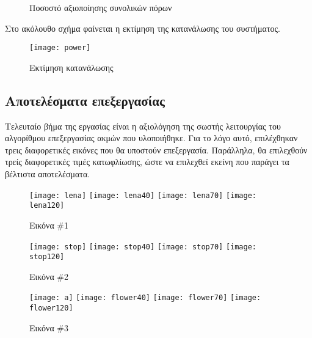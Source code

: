 \begin{figure}[H]
	\begin{center}
	\end{center}
	\caption{Ποσοστό αξιοποίησης συνολικών πόρων}
\end{figure}
\noindent Στο ακόλουθο σχήμα φαίνεται η εκτίμηση της κατανάλωσης του συστήματος.

\begin{figure}[H]
   \centering
   \texttt{[image: power]}\\
   \caption{Εκτίμηση κατανάλωσης}
\end{figure}

\subsection{Αποτελέσματα επεξεργασίας}

Τελευταίο βήμα της εργασίας είναι η αξιολόγηση της σωστής λειτουργίας του αλγορίθμου επεξεργασίας ακμών που υλοποιήθηκε. Για το λόγο αυτό, επιλέχθηκαν τρεις διαφορετικές εικόνες που θα υποστούν επεξεργασία. Παράλληλα, θα επιλεχθούν τρείς διαφορετικές τιμές κατωφλίωσης, ώστε να επιλεχθεί εκείνη που παράγει τα βέλτιστα αποτελέσματα.
\begin{figure}[H]
\centering
{}%
  {\texttt{[image: lena]}}
  {\texttt{[image: lena40]}}
	{\texttt{[image: lena70]}}
	{\texttt{[image: lena120]}}
\caption{Εικόνα \#1}
\end{figure}
\begin{figure}[H]
\centering
{}%
  {\texttt{[image: stop]}}
  {\texttt{[image: stop40]}}
	{\texttt{[image: stop70]}}
	{\texttt{[image: stop120]}}
\caption{Εικόνα \#2}
\end{figure}
\begin{figure}[H]
\centering
{}%
  {\texttt{[image: a]}}
  {\texttt{[image: flower40]}}
	{\texttt{[image: flower70]}}
	{\texttt{[image: flower120]}}
\caption{Εικόνα \#3}
\end{figure}

